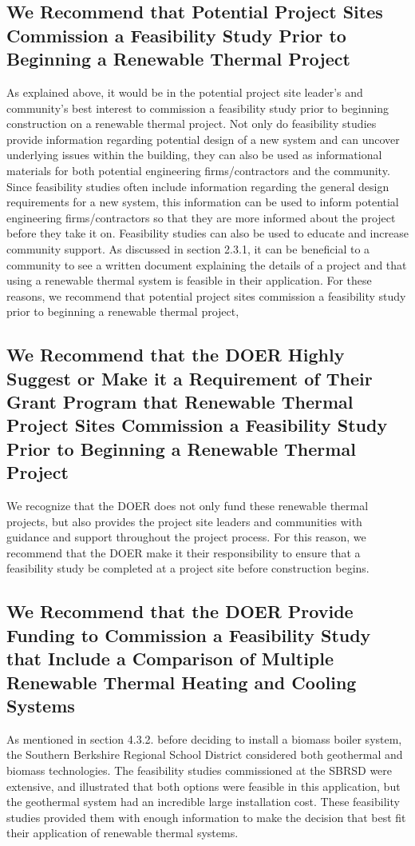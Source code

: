 \subsection{We Recommend that Potential Project Sites Commission a Feasibility Study Prior to Beginning a Renewable Thermal Project}
\par As explained above, it would be in the potential project site leader’s and community’s best interest to commission a feasibility study prior to beginning construction on a renewable thermal project. Not only do feasibility studies provide information regarding potential design of a new system and can uncover underlying issues within the building, they can also be used as informational materials for both potential engineering firms/contractors and the community. Since feasibility studies often include information regarding the general design requirements for a new system, this information can be used to inform potential engineering firms/contractors so that they are more informed about the project before they take it on. Feasibility studies can also be used to educate and increase community support. As discussed in section 2.3.1, it can be beneficial to a community to see a written document explaining the details of a project and that using a renewable thermal system is feasible in their application. For these reasons, we recommend that potential project sites commission a feasibility study prior to beginning a renewable thermal project,

\subsection{We Recommend that the DOER Highly Suggest or Make it a Requirement of Their Grant Program that Renewable Thermal Project Sites Commission a Feasibility Study Prior to Beginning a Renewable Thermal Project}
\par We recognize that the DOER does not only fund these renewable thermal projects, but also provides the project site leaders and communities with guidance and support throughout the project process. For this reason, we recommend that the DOER make it their responsibility to ensure that a feasibility study be completed at a project site before construction begins.

\subsection{We Recommend that the DOER Provide Funding to Commission a Feasibility Study that Include a Comparison of Multiple Renewable Thermal Heating and Cooling Systems}
\par As mentioned in section 4.3.2. before deciding to install a biomass boiler system, the Southern Berkshire Regional School District considered both geothermal and biomass technologies. The feasibility studies commissioned at the SBRSD were extensive, and illustrated that both options were feasible in this application, but the geothermal system had an incredible large installation cost. These feasibility studies provided them with enough information to make the decision that best fit their application of renewable thermal systems. 

